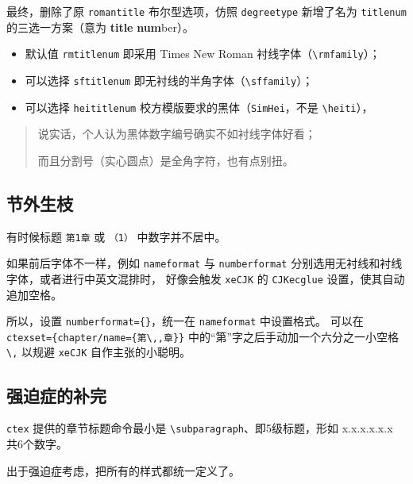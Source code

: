 \documentclass[../Main/thesis.tex]{subfiles}
\begin{document}
最终，删除了原 \texttt{romantitle} 布尔型选项，仿照 \texttt{degreetype} 新增了名为 \texttt{titlenum} 的三选一方案（意为 \textbf{title} \textbf{num}ber）。

\begin{itemize}
\item 默认值 \texttt{rmtitlenum} 即采用 Times New Roman 衬线字体（\texttt{\textbackslash{}rmfamily}）；
\item 可以选择 \texttt{sftitlenum} 即无衬线的半角字体（\texttt{\textbackslash{}sffamily}）；
\item 可以选择 \texttt{heititlenum} 校方模版要求的黑体（\texttt{SimHei}，不是 \texttt{\textbackslash{}heiti}），
\end{itemize}

\begin{quote}
说实话，个人认为黑体数字编号确实不如衬线字体好看；

而且分割号（实心圆点）是全角字符，也有点别扭。
\end{quote}

\subsection{节外生枝}

有时候标题 \texttt{第1章} 或 \texttt{（1）} 中数字并不居中。

如果前后字体不一样，例如 \texttt{nameformat} 与 \texttt{numberformat} 分别选用无衬线和衬线字体，或者进行中英文混排时， 好像会触发 \texttt{xeCJK} 的 \texttt{CJKecglue} 设置，使其自动追加空格。

所以，设置 \texttt{numberformat=\{\}}，统一在 \texttt{nameformat} 中设置格式。 可以在 \texttt{ctexset=\{chapter/name=\{第\textbackslash{},,章\}\}} 中的“第”字之后手动加一个六分之一小空格 \texttt{\textbackslash{},} 以规避 \texttt{xeCJK} 自作主张的小聪明。

\subsection{强迫症的补完}

\texttt{ctex} 提供的章节标题命令最小是 \texttt{\textbackslash{}subparagraph}、即5级标题，形如 x.x.x.x.x.x 共6个数字。

出于强迫症考虑，把所有的样式都统一定义了。
\end{document}
